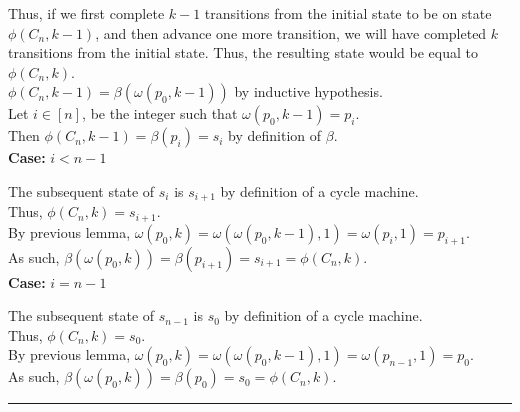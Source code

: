 \documentclass[a4paper,12pt]{article}
\begin{document}
\noindent Thus, if we first complete $k - 1$ transitions from the initial state to be on state $\phi(C_n, k - 1)$, and then advance one more transition, we will have completed $k$ transitions from the initial state. Thus, the resulting state would be equal to $\phi(C_n, k)$.\\

\noindent $\phi(C_n, k - 1) = \beta(\omega(p_0, k - 1))$ by inductive hypothesis.\\

\noindent Let $i \in [n]$, be the integer such that $\omega(p_0, k - 1) = p_i$.\\

\noindent Then $\phi(C_n, k - 1) = \beta(p_i) = s_i$ by definition of $\beta$.\\


\noindent
\textbf{Case:} $i < n - 1$

\noindent The subsequent state of $s_i$ is $s_{i+1}$ by definition of a cycle machine.\\

\noindent Thus, $\phi(C_n, k) = s_{i+1}$.\\

\noindent By previous lemma, $\omega(p_0, k) = \omega(\omega(p_0, k - 1), 1) = \omega(p_i, 1) = p_{i+1}$.\\

\noindent As such, $\beta(\omega(p_0, k)) = \beta(p_{i+1}) = s_{i + 1} = \phi(C_n, k)$.\\


\noindent
\textbf{Case:} $i = n - 1$

\noindent The subsequent state of $s_{n-1}$ is $s_0$ by definition of a cycle machine.\\

\noindent Thus, $\phi(C_n, k) = s_0$.\\

\noindent By previous lemma, $\omega(p_0, k) = \omega(\omega(p_0, k - 1), 1) = \omega(p_{n-1}, 1) = p_0$.\\

\noindent As such, $\beta(\omega(p_0, k)) = \beta(p_0) = s_0 = \phi(C_n, k)$.\\


\noindent 
\begin{center}
\noindent\rule{8cm}{0.4pt}
\end{center}
\end{document}
